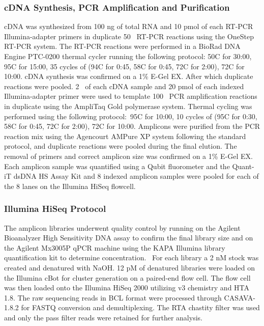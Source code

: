 \subsubsection{cDNA Synthesis, PCR Amplification and Purification}
cDNA was synthesized from 100 ng of total RNA and 10 pmol of each RT-PCR Illumina-adapter primers in duplicate 50 \microliter~RT-PCR reactions using the OneStep RT-PCR system. The RT-PCR reactions were performed in a BioRad DNA Engine PTC-0200 thermal cycler running the following protocol: 50\degree C for 30:00, 95\degree C for 15:00, 35 cycles of (94\degree C for 0:45, 58\degree C for 0:45, 72\degree C for 2:00), 72\degree C for 10:00. cDNA synthesis was confirmed on a 1\% E-Gel EX. After which duplicate reactions were pooled. 2 \microliter~of each cDNA sample and 20 pmol of each indexed Illumina-adapter primer were used to template 100 \microliter~PCR amplification reactions in duplicate using the AmpliTaq Gold polymerase system. Thermal cycling was performed using the following protocol: 95\degree C for 10:00, 10 cycles of (95\degree C for 0:30, 58\degree C for 0:45, 72\degree C for 2:00), 72\degree C for 10:00. Amplicons were purified from the PCR reaction mix using the Agencourt AMPure XP system following the standard protocol, and duplicate reactions were pooled during the final elution. The removal of primers and correct amplicon size was confirmed on a 1\% E-Gel EX. Each amplicon sample was quantified using a Qubit fluorometer and the Quant-iT\textsuperscript{\textregistered} dsDNA HS Assay Kit and 8 indexed amplicon samples were pooled for each of the 8 lanes on the Illumina HiSeq flowcell.

\subsubsection{Illumina HiSeq Protocol}
The amplicon libraries underwent quality control by running on the Agilent Bioanalyzer High Sensitivity DNA assay to confirm the final library size and on the Agilent Mx3005P qPCR machine using the KAPA Illumina library quantification kit to determine concentration.  For each library a 2 nM stock was created and denatured with NaOH. 12 pM of denatured libraries were loaded on the Illumina cBot for cluster generation on a paired-end flow cell. The flow cell was then loaded onto the Illumina HiSeq 2000 utilizing v3 chemistry and HTA 1.8. The raw sequencing reads in BCL format were processed through CASAVA-1.8.2 for FASTQ conversion and demultiplexing. The RTA chastity filter was used and only the pass filter reads were retained for further analysis.


